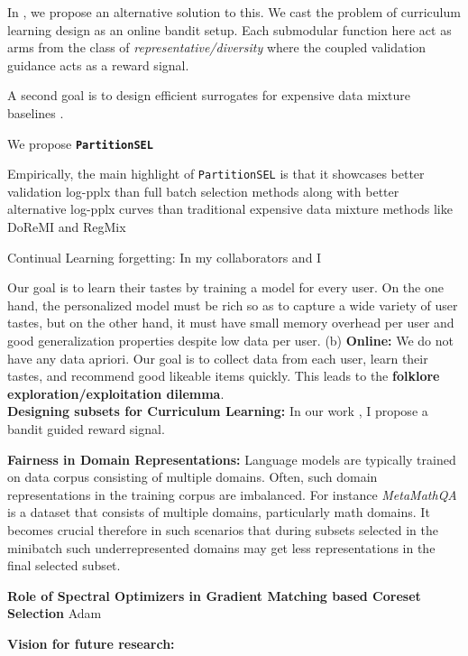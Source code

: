 \documentclass[11pt,a4paper,sans,usenames,dvipsnames]{moderncv} %
\begin{document}
In \cite{chanda2026bandit}, we propose an alternative solution to this. We cast the problem of curriculum learning design as an online bandit setup. Each submodular function here act as arms from the class of \emph{representative/diversity} where the coupled validation guidance acts as a reward signal.

A second goal is to design efficient surrogates for expensive data mixture baselines \cite{xie2023doremi,liu2025regmix}.

We propose \textbf{\texttt{PartitionSEL}}
\cite{agrawal2026minibatch}

Empirically, the main highlight of \texttt{PartitionSEL} is that it showcases better validation log-pplx than full batch selection methods along with better alternative log-pplx curves than traditional expensive data mixture methods like DoReMI and RegMix \cite{xie2023doremi, liu2025regmix}

Continual Learning forgetting: In \cite{nayak2026sculpting} my collaborators and I

Our goal is to learn their tastes by training a model for every user. On the one hand, the personalized model must be rich so as to capture a wide variety of user tastes, but on the other hand, it must have small memory overhead per user and good generalization properties despite low data per user. (b) \textbf{Online:} We do not have any data apriori. Our goal is to collect data from each user, learn their tastes, and recommend good likeable items quickly. This leads to the \textbf{folklore exploration/exploitation dilemma}.\\

\noindent \textbf{Designing subsets for Curriculum Learning:} In our work \cite{chanda2026bandit}, I propose a bandit guided reward signal.

\noindent \textbf{Fairness in Domain Representations:}
Language models are typically trained on data corpus consisting of multiple domains. Often, such domain representations in the training corpus are imbalanced. For instance \emph{MetaMathQA} \cite{yu2024metamath} is a dataset that consists of multiple domains, particularly math domains. It becomes crucial therefore in such scenarios that during subsets selected in the minibatch such underrepresented domains may get less representations in the final selected subset.

\noindent \textbf{Role of Spectral Optimizers in Gradient Matching based Coreset Selection} Adam \cite{kingma2014adam}

\noindent \textbf{Vision for future research:}
\end{document}

